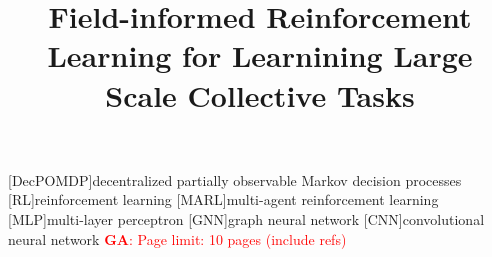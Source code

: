 \documentclass[conference]{IEEEtran}
\begin{document}
%
\title{Field-informed Reinforcement Learning for Learnining Large Scale Collective Tasks} %
%

\author{

\and
{}
\and
{}
}
%
\maketitle              %
%

\newcommand{\meta}[3]{\textcolor{#1}{\textbf{#2}: #3}}
\newcommand{\ga}[1]{\meta{red}{GA}{#1}}
\newcommand{\lukas}[1]{\meta{purple}{Lukas}{#1}}
\newcommand{\mv}[1]{\meta{green}{MV}{#1}}
[DecPOMDP]{decentralized partially observable Markov decision processes}
[RL]{reinforcement learning}
[MARL]{multi-agent reinforcement learning}
[MLP]{multi-layer perceptron}
[GNN]{graph neural network}
[CNN]{convolutional neural network}
\ga{Page limit: 10 pages (include refs)}
\end{document}
